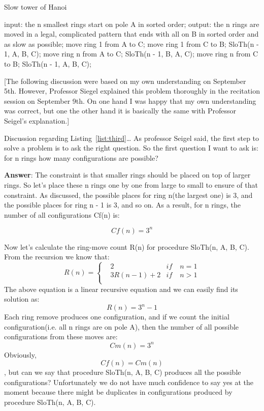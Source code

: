 \documentclass[a4paper,11pt]{article}
\theoremstyle{mytheor}
\begin{document}
\begin{algorithm}[H]
\caption{Slow tower of Hanoi}\label{ex12}
\begin{algorithmic}[1]
  \State input: the n smallest rings start on pole A in sorted order;
  \State output: the n rings are moved in a legal, complicated pattern that ends with all on B in sorted order and as slow as possible;
   \State move ring 1 from A to C;
   \State move ring 1 from C to B;
  \Else
   \State SloTh(n - 1, A, B, C); 
   \State move ring n from A to C;
   \State SloTh(n - 1, B, A, C); 
   \State move ring n from C to B;
   \State SloTh(n - 1, A, B, C); 
  \EndIf
\EndProcedure
\end{algorithmic}
\end{algorithm}

[The following discussion were based on my own understanding on September 5th. However, Professor Siegel explained this problem thoroughly in the recitation session on September 9th. On one hand I was happy that my own understanding was correct, but one the other hand it is basically the same with Professor Seigel's explanation.]

Discussion regarding Listing~\ref{list:third}\ldots{} 
As professor Seigel said, the first step to solve a problem is to ask the right question. So the first question I want to ask is: for n rings how many configurations are possible?

\textbf{Answer}: The constraint is that smaller rings should be placed on top of larger rings. So let's place these n rings one by one from large to small to ensure of that constraint. As discussed, the possible places for ring n(the largest one) is 3, and the possible places for ring n - 1 is 3, and so on. As a result, for n rings, the number of all configurations Cf(n) is:

$$Cf(n) = 3^{n}$$

Now let's calculate the ring-move count R(n) for procedure SloTh(n, A, B, C).
From the recursion we know that:
$$R(n)=\left\{
\begin{aligned}
&2  & if\; &  n = 1 \\
&3R(n-1) + 2  & if\; &  n > 1 \\
\end{aligned}
\right.
$$
The above equation is a linear recursive equation and we can easily find its solution as:
$$
R(n) = 3^{n} - 1
$$
Each ring remove produces one configuration, and if we count the initial configuration(i.e. all n rings are on pole A), then the number of all possible configurations from these moves are:
$$
Cm(n) = 3^{n}
$$
Obviously, $$Cf(n) = Cm(n)$$, but can we say that procedure SloTh(n, A, B, C) produces all the possible configurations? Unfortunately we do not have much confidence to say yes at the moment because there might be duplicates in configurations produced by procedure SloTh(n, A, B, C).
\end{document}
